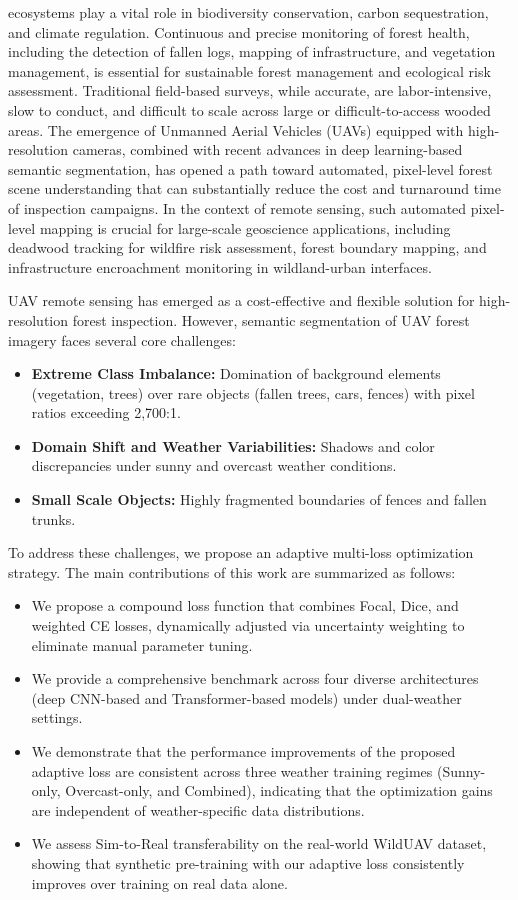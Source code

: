 \documentclass[journal,compsoc]{IEEEtran}
\begin{document}
 ecosystems play a vital role in biodiversity conservation, carbon sequestration, and climate regulation. Continuous and precise monitoring of forest health, including the detection of fallen logs, mapping of infrastructure, and vegetation management, is essential for sustainable forest management and ecological risk assessment. Traditional field-based surveys, while accurate, are labor-intensive, slow to conduct, and difficult to scale across large or difficult-to-access wooded areas. The emergence of Unmanned Aerial Vehicles (UAVs) equipped with high-resolution cameras, combined with recent advances in deep learning-based semantic segmentation, has opened a path toward automated, pixel-level forest scene understanding that can substantially reduce the cost and turnaround time of inspection campaigns. In the context of remote sensing, such automated pixel-level mapping is crucial for large-scale geoscience applications, including deadwood tracking for wildfire risk assessment, forest boundary mapping, and infrastructure encroachment monitoring in wildland-urban interfaces.

UAV remote sensing has emerged as a cost-effective and flexible solution for high-resolution forest inspection. However, semantic segmentation of UAV forest imagery faces several core challenges:
\begin{itemize}
    \item \textbf{Extreme Class Imbalance:} Domination of background elements (vegetation, trees) over rare objects (fallen trees, cars, fences) with pixel ratios exceeding 2,700:1.
    \item \textbf{Domain Shift and Weather Variabilities:} Shadows and color discrepancies under sunny and overcast weather conditions.
    \item \textbf{Small Scale Objects:} Highly fragmented boundaries of fences and fallen trunks.
\end{itemize}

To address these challenges, we propose an adaptive multi-loss optimization strategy. The main contributions of this work are summarized as follows:
\begin{itemize}
    \item We propose a compound loss function that combines Focal, Dice, and weighted CE losses, dynamically adjusted via uncertainty weighting to eliminate manual parameter tuning.
    \item We provide a comprehensive benchmark across four diverse architectures (deep CNN-based and Transformer-based models) under dual-weather settings.
    \item We demonstrate that the performance improvements of the proposed adaptive loss are consistent across three weather training regimes (Sunny-only, Overcast-only, and Combined), indicating that the optimization gains are independent of weather-specific data distributions.
    \item We assess Sim-to-Real transferability on the real-world WildUAV dataset, showing that synthetic pre-training with our adaptive loss consistently improves over training on real data alone.
\end{itemize}
\end{document}
